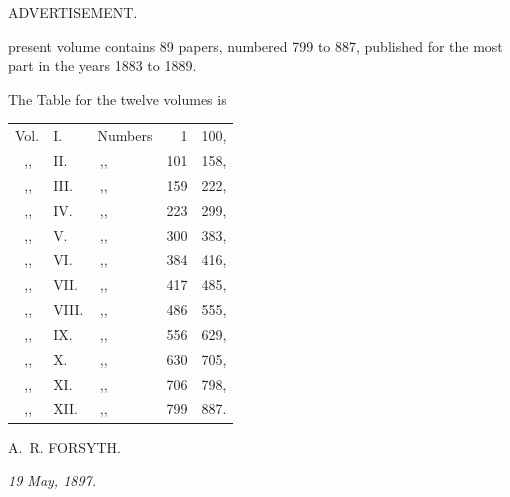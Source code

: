 \documentclass[11pt,a4paper]{article}
\providecommand{\textsc}[1]{{\scshape #1}}
\begin{document}
\setcounter{page}{5}

\thispagestyle{plain}
\vspace*{2em}
\begin{center}
{\Large ADVERTISEMENT.}
\end{center}
\vspace{2em}

\noindent\textsc{The} present volume contains 89 papers, numbered 799 to 887, published for the most part in the years 1883 to 1889.

\medskip

\noindent The Table for the twelve volumes is

\vspace{1em}

\begin{center}
\begin{tabular}{rl@{\quad}l@{\quad}r@{ to }r}
Vol. & I.    & Numbers & 1   & 100,\\
\,,,\ & II.   & \,,,\  & 101 & 158,\\
\,,,\ & III.  & \,,,\  & 159 & 222,\\
\,,,\ & IV.   & \,,,\  & 223 & 299,\\
\,,,\ & V.    & \,,,\  & 300 & 383,\\
\,,,\ & VI.   & \,,,\  & 384 & 416,\\
\,,,\ & VII.  & \,,,\  & 417 & 485,\\
\,,,\ & VIII. & \,,,\  & 486 & 555,\\
\,,,\ & IX.   & \,,,\  & 556 & 629,\\
\,,,\ & X.    & \,,,\  & 630 & 705,\\
\,,,\ & XI.   & \,,,\  & 706 & 798,\\
\,,,\ & XII.  & \,,,\  & 799 & 887.
\end{tabular}
\end{center}

\vspace{2em}

\begin{flushright}
A.~R. FORSYTH.
\end{flushright}

\vspace{1em}

\begin{flushleft}
\textit{19 May, 1897.}
\end{flushleft}
\end{document}
